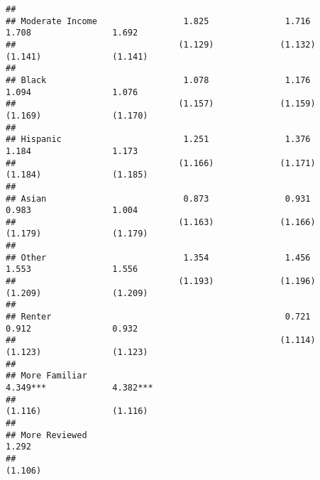 \documentclass[
]{article}
\begin{document}
\begin{verbatim}
##                                                                                                           
## Moderate Income                 1.825               1.716               1.708                1.692        
##                                (1.129)             (1.132)             (1.141)              (1.141)       
##                                                                                                           
## Black                           1.078               1.176               1.094                1.076        
##                                (1.157)             (1.159)             (1.169)              (1.170)       
##                                                                                                           
## Hispanic                        1.251               1.376               1.184                1.173        
##                                (1.166)             (1.171)             (1.184)              (1.185)       
##                                                                                                           
## Asian                           0.873               0.931               0.983                1.004        
##                                (1.163)             (1.166)             (1.179)              (1.179)       
##                                                                                                           
## Other                           1.354               1.456               1.553                1.556        
##                                (1.193)             (1.196)             (1.209)              (1.209)       
##                                                                                                           
## Renter                                              0.721               0.912                0.932        
##                                                    (1.114)             (1.123)              (1.123)       
##                                                                                                           
## More Familiar                                                          4.349***             4.382***      
##                                                                        (1.116)              (1.116)       
##                                                                                                           
## More Reviewed                                                                                1.292        
##                                                                                             (1.106)       

\end{verbatim}
\end{document}
